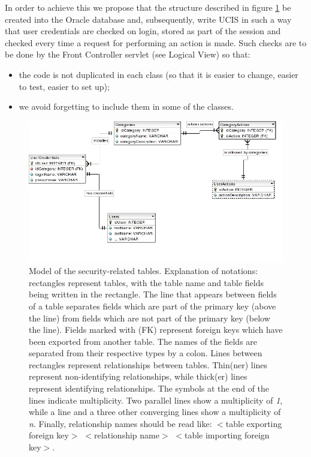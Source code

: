 In order to achieve this we propose that the structure described in figure \ref{fig:dbs} be created into the Oracle database
and, subsequently, write UCIS in such a way that user credentials are checked on login, stored as part of the session
and checked every time a request for performing an action is made. Such checks are to be done by the Front Controller
servlet (see Logical View) so that:

\begin{itemize}
\item the code is not duplicated in each class (so that it is easier to change, easier to test, easier to set up);
\item we avoid forgetting to include them in some of the classes.
\end{itemize}

\begin{figure}[ht]
\begin{center}
\includegraphics[width=\linewidth]{img/db-security.png}
\end{center}
\caption{Model of the security-related tables. Explanation of notations: rectangles represent tables, with the
table name and table fields being written in the rectangle. The line that appears between fields of a table
separates fields which are part of the primary key (above the line) from fields which are not part of the
primary key (below the line). Fields marked with (FK) represent foreign keys which have been exported from another table.
The names of the fields are separated from their respective types by a colon. Lines between rectangles represent
relationships between tables. Thin(ner) lines represent non-identifying relationships, while thick(er) lines
represent identifying relationships. The symbols at the end of the lines indicate multiplicity. Two parallel lines
show a multiplicity of \textit{1}, while a line and a three other converging lines show a multiplicity of \textit{n}.
Finally, relationship names should be read like: $<$table exporting foreign key$>$ $<$relationship name$>$
$<$table importing foreign key$>$.}
\label{fig:dbs}
\end{figure}

